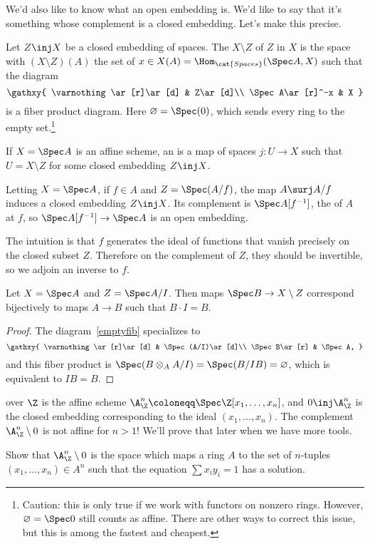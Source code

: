 We'd also like to know what an open embedding is. We'd like to say that it's something whose complement is a closed
embedding. Let's make this precise.
\begin{defn}
Let $Z\inj X$ be a closed embedding of spaces. The  $X\setminus Z$ of $Z$ in $X$ is the space with
$(X\setminus Z)(A)$ the set of $x\in X(A) = \Hom_{\cat{Spaces}}(\Spec A, X)$ such that the diagram
\begin{equation}
\label{emptyfib}
\gathxy{
	\varnothing\ar[r]\ar[d] & Z\ar[d]\\
	\Spec A\ar[r]^-x & X
}
\end{equation}
is a fiber product diagram. Here $\varnothing = \Spec(0)$, which sends every ring to the empty
set.\footnote{Caution: this is only true if we work with functors on nonzero rings. However, $\varnothing = \Spec
0$ still counts as affine. There are other ways to correct this issue, but this is among the fastest and cheapest.}
\end{defn}
\begin{defn}
If $X = \Spec A$ is an affine scheme, an  is a map of spaces $j\colon U\to X$ such that $U =
X\setminus Z$ for some closed embedding $Z\inj X$.
\end{defn}
\begin{exm}
Letting $X = \Spec A$, if $f\in A$ and $Z = \Spec(A/f)$, the map $A\surj A/f$ induces a closed embedding $Z\inj X$.
Its complement is $\Spec A[f^{-1}]$, the  of $A$ at $f$, so $\Spec A[f^{-1}]\to\Spec A$ is an
open embedding.
\end{exm}
The intuition is that $f$ generates the ideal of functions that vanish precisely on the closed subset $Z$.
Therefore on the complement of $Z$, they should be invertible, so we adjoin an inverse to $f$.
\begin{lem}
\label{factors_through}
Let $X = \Spec A$ and $Z = \Spec A/I$. Then maps $\Spec B\to X\setminus Z$ correspond bijectively to maps $A\to B$
such that $B\cdot I = B$.
\end{lem}
\begin{proof}
The diagram~\eqref{emptyfib} specializes to
\begin{equation}
\gathxy{
	\varnothing\ar[r]\ar[d] & \Spec(A/I)\ar[d]\\
	\Spec B\ar[r] & \Spec A,
}
\end{equation}
and this fiber product is $\Spec(B\otimes_A A/I) = \Spec(B/IB) = \varnothing$, which is equivalent to $IB = B$.
\end{proof}
\begin{exm}
 over $\Z$ is the affine scheme $\A_\Z^n\coloneqq\Spec \Z[x_1,\dotsc,x_n]$, and
$0\inj\A_\Z^n$ is the closed embedding corresponding to the ideal $(x_1,\dotsc,x_n)$. The complement
$\A_\Z^n\setminus 0$ is not affine for $n > 1$! We'll prove that later when we have more tools.
\end{exm}
\begin{ex}
Show that $\A_\Z^n\setminus 0$ is the space which maps a ring $A$ to the set of $n$-tuples $(x_1,\dotsc,x_n)\in
A^n$ such that the equation $\sum x_iy_i = 1$ has a solution.
\end{ex}

